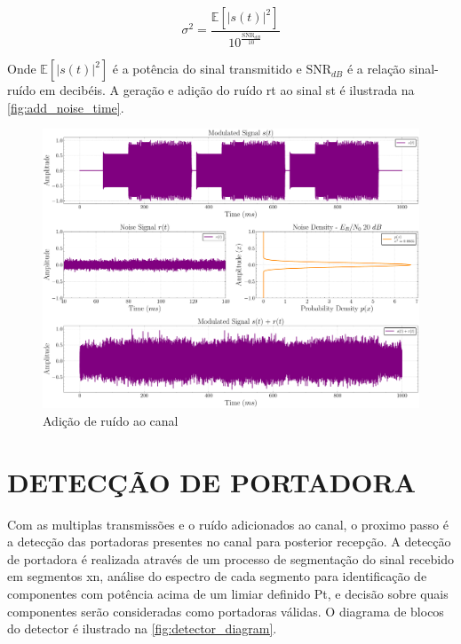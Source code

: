 \begin{equation}
    \sigma^2 = \frac{\mathbb{E}\!\left[ |s(t)|^2 \right]}{10^{\frac{\mathrm{SNR}_{dB}}{10}}}
\end{equation}

\noindent Onde $\mathbb{E}\!\left[ |s(t)|^2 \right]$ é a potência do sinal transmitido e $\mathrm{SNR}_{dB}$ é a relação sinal-ruído em decibéis. A geração e adição do ruído \gls{rt} ao sinal \gls{st} é ilustrada na \autoref{fig:add_noise_time}.

\begin{figure}[H]
	\centering
	\caption{Adição de ruído ao canal}\label{fig:add_noise_time}
	\includegraphics[width=\linewidth]{assets/cap3/example_channel_time_channel.pdf}
\end{figure}

\section{DETECÇÃO DE PORTADORA}\label{sec:detector}

Com as multiplas transmissões e o ruído adicionados ao canal, o proximo passo é a detecção das portadoras presentes no canal para posterior recepção. A detecção de portadora é realizada através de um processo de segmentação do sinal recebido em segmentos \gls{xn}, análise do espectro de cada segmento para identificação de componentes com potência acima de um limiar definido \gls{Pt}, e decisão sobre quais componentes serão consideradas como portadoras válidas. O diagrama de blocos do detector é ilustrado na \autoref{fig:detector_diagram}.

